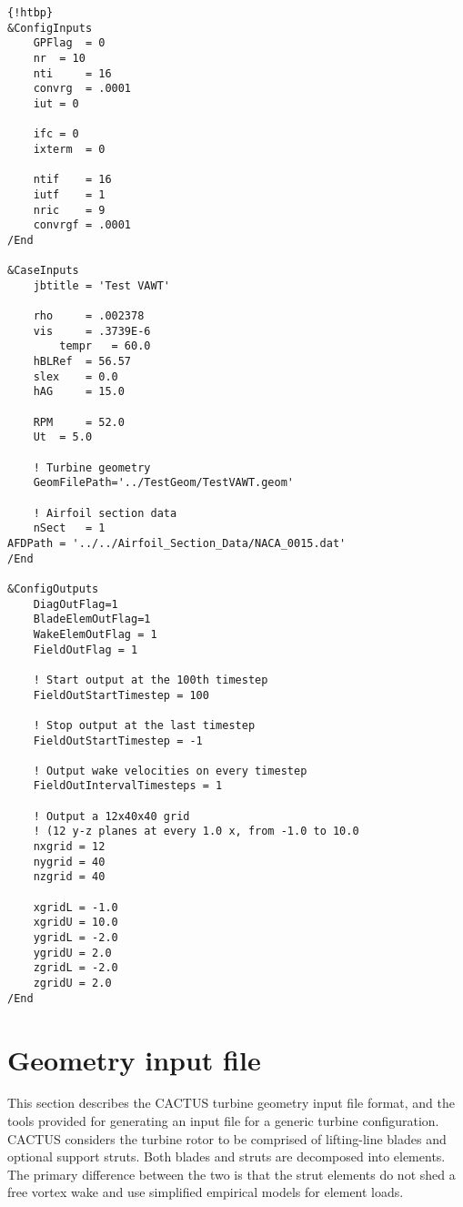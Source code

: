 \begin{lstlisting}{!htbp}
&ConfigInputs
    GPFlag  = 0
    nr  = 10
    nti     = 16
    convrg  = .0001
    iut = 0
    
    ifc = 0
    ixterm  = 0

    ntif    = 16
    iutf    = 1
    nric    = 9
    convrgf = .0001
/End

&CaseInputs
    jbtitle = 'Test VAWT'  

    rho     = .002378  
    vis     = .3739E-6                                   
        tempr   = 60.0 
    hBLRef  = 56.57
    slex    = 0.0
    hAG     = 15.0
                                            
    RPM     = 52.0
    Ut  = 5.0   

    ! Turbine geometry
    GeomFilePath='../TestGeom/TestVAWT.geom'

    ! Airfoil section data
    nSect   = 1
AFDPath = '../../Airfoil_Section_Data/NACA_0015.dat' 
/End

&ConfigOutputs 
    DiagOutFlag=1
    BladeElemOutFlag=1
    WakeElemOutFlag = 1
    FieldOutFlag = 1

    ! Start output at the 100th timestep
    FieldOutStartTimestep = 100

    ! Stop output at the last timestep  
    FieldOutStartTimestep = -1
    
    ! Output wake velocities on every timestep
    FieldOutIntervalTimesteps = 1

    ! Output a 12x40x40 grid
    ! (12 y-z planes at every 1.0 x, from -1.0 to 10.0 
    nxgrid = 12
    nygrid = 40
    nzgrid = 40

    xgridL = -1.0
    xgridU = 10.0
    ygridL = -2.0
    ygridU = 2.0
    zgridL = -2.0
    zgridU = 2.0
/End
\end{lstlisting}


\section{Geometry input file}
This section describes the CACTUS turbine geometry input file format, and the tools provided for generating an input file for a generic turbine configuration. CACTUS considers the turbine rotor to be comprised of lifting-line blades and optional support struts. Both blades and struts are decomposed into elements. The primary difference between the two is that the strut elements do not shed a free vortex wake and use simplified empirical models for element loads.

